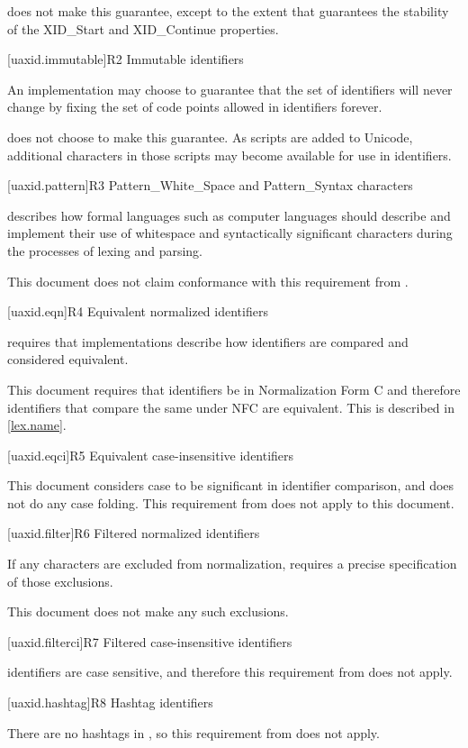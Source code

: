 \pnum
\Cpp{} does not make this guarantee,
except to the extent that  guarantees
the stability of the XID_Start and XID_Continue properties.

[uaxid.immutable]{R2 Immutable identifiers}

\pnum
An implementation may choose to guarantee that
the set of identifiers will never change
by fixing the set of code points allowed in identifiers forever.

\pnum
\Cpp{} does not choose to make this guarantee.
As scripts are added to Unicode,
additional characters in those scripts may become available
for use in identifiers.

[uaxid.pattern]{R3 Pattern_White_Space and Pattern_Syntax characters}

\pnum
{} describes how formal languages
such as computer languages should describe and implement
their use of whitespace and syntactically significant characters
during the processes of lexing and parsing.

\pnum
This document does not claim conformance with this requirement from .

[uaxid.eqn]{R4 Equivalent normalized identifiers}

\pnum
{} requires that implementations describe
how identifiers are compared and considered equivalent.

\pnum
This document requires that identifiers be in Normalization Form C and
therefore identifiers that compare the same under NFC are equivalent.
This is described in \ref{lex.name}.

[uaxid.eqci]{R5 Equivalent case-insensitive identifiers}

\pnum
This document considers case to be significant in identifier comparison, and
does not do any case folding.
This requirement from  does not apply to this document.

[uaxid.filter]{R6 Filtered normalized identifiers}

\pnum
If any characters are excluded from normalization,
 requires a precise specification of those exclusions.

\pnum
This document does not make any such exclusions.

[uaxid.filterci]{R7 Filtered case-insensitive identifiers}

\pnum
\Cpp{} identifiers are case sensitive, and
therefore this requirement from  does not apply.

[uaxid.hashtag]{R8 Hashtag identifiers}

\pnum
There are no hashtags in \Cpp{}, so this requirement from  does not apply.
